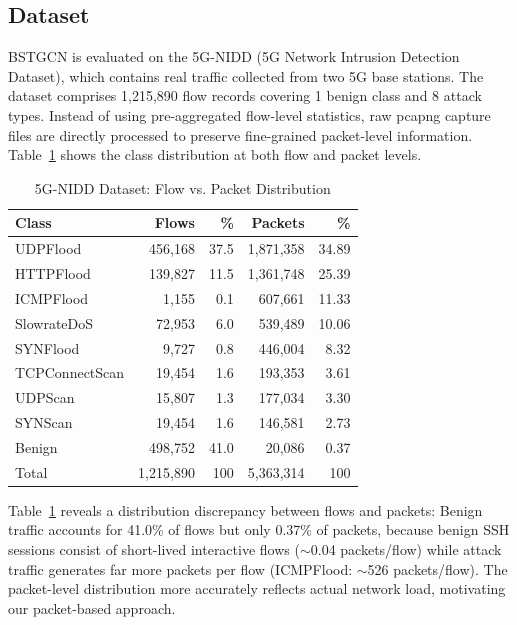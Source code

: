 \documentclass[lettersize,journal]{IEEEtran}
\begin{document}
\subsection{Dataset}

BSTGCN is evaluated on the 5G-NIDD (5G Network Intrusion Detection Dataset), which contains real traffic collected from two 5G base stations. The dataset comprises 1,215,890 flow records covering 1 benign class and 8 attack types. Instead of using pre-aggregated flow-level statistics, raw pcapng capture files are directly processed to preserve fine-grained packet-level information. Table~\ref{tab:dataset} shows the class distribution at both flow and packet levels.

\begin{table}[!t]
\caption{5G-NIDD Dataset: Flow vs. Packet Distribution\label{tab:dataset}}
\centering
\setlength{\tabcolsep}{3pt}
\begin{tabular}{lrrrr}
\toprule
Class & Flows & \% & Packets & \% \\
\midrule
UDPFlood        & 456,168 & 37.5 & 1,871,358 & 34.89 \\
HTTPFlood       & 139,827 & 11.5 & 1,361,748 & 25.39 \\
ICMPFlood       & 1,155   & 0.1  & 607,661   & 11.33 \\
SlowrateDoS     & 72,953  & 6.0  & 539,489   & 10.06 \\
SYNFlood        & 9,727   & 0.8  & 446,004   & 8.32 \\
TCPConnectScan  & 19,454  & 1.6  & 193,353   & 3.61 \\
UDPScan         & 15,807  & 1.3  & 177,034   & 3.30 \\
SYNScan         & 19,454  & 1.6  & 146,581   & 2.73 \\
Benign          & 498,752 & 41.0 & 20,086    & 0.37 \\
\midrule
Total           & 1,215,890 & 100 & 5,363,314 & 100 \\
\bottomrule
\end{tabular}
\end{table}


Table~\ref{tab:dataset} reveals a distribution discrepancy between flows and packets: Benign traffic accounts for 41.0\% of flows but only 0.37\% of packets, because benign SSH sessions consist of short-lived interactive flows ($\sim$0.04 packets/flow) while attack traffic generates far more packets per flow (ICMPFlood: $\sim$526 packets/flow). The packet-level distribution more accurately reflects actual network load, motivating our packet-based approach.
\end{document}
